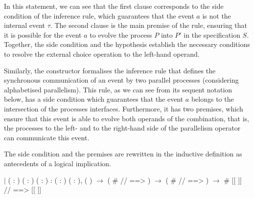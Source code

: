 In this statement, we can see that the first clause corresponds to the side condition of the inference rule, which guarantees that the event $a$ is not the internal event $ \tau $. The second clause is the main premise of the rule, ensuring that it is possible for the event $ a $ to evolve the process $ P $ into $ P' $ in the specification $ S $. Together, the side condition and the hypothesis establish the necessary conditions to resolve the external choice operation to the left-hand operand.

Similarly, the constructor  formalises the inference rule that defines the synchronous communication of an event by two parallel processes (considering alphabetised parallelism). This rule, as we can see from its sequent notation below, has a side condition which guarantees that the event $a$ belongs to the intersection of the processes interfaces. Furthermore, it has two premises, which ensure that this event is able to evolve both operands of the combination, that is, the processes to the left- and to the right-hand side of the parallelism operator can communicate this event.

\begin{prooftree}
\end{prooftree}

The side condition and the premises are rewritten in the inductive definition as antecedents of a logical implication.

\begin{coqdoccode}
	\coqdocnoindent
	\ensuremath{|}  ( : ) (  : ) (  :  ) :\coqdoceol
	\coqdocindent{1.00em}
	\coqdockw{\ensuremath{\forall}} (  : ) ( : ),\coqdoceol
	\coqdocindent{3.00em}
	  (   ) \ensuremath{\rightarrow}\coqdoceol
	\coqdocindent{3.00em}
	( \#  //   ==> ) \ensuremath{\rightarrow}\coqdoceol
	\coqdocindent{3.00em}
	( \#  //   ==> ) \ensuremath{\rightarrow}\coqdoceol
	\coqdocindent{3.00em}
	 \#  [[    ]]  //   ==>  [[    ]] \coqdoceol
\end{coqdoccode}

